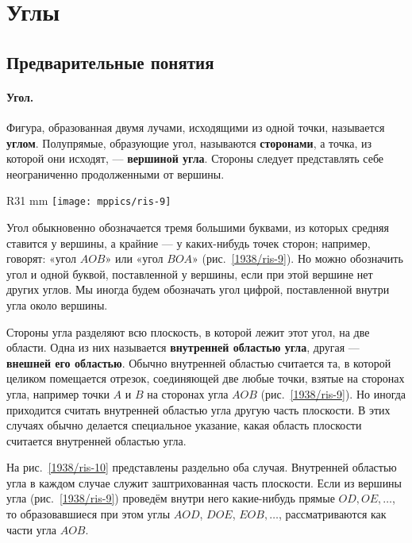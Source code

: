
\section{Углы} 

\subsection*{Предварительные понятия}

\paragraph{Угол.}\label{1938/13}
Фигура, образованная двумя лучами, исходящими из одной точки, называется \textbf{углом}.
Полупрямые, образующие угол, называются \textbf{сторонами}, а точка, из которой они исходят, — \textbf{вершиной угла}.
Стороны следует представлять себе неограниченно продолженными от вершины.

\begin{wrapfigure}{R}{31 mm}
\centering
\texttt{[image: mppics/ris-9]}
\caption{}\label{1938/ris-9}
\end{wrapfigure}

Угол обыкновенно обозначается тремя большими буквами, из которых средняя ставится у вершины, а крайние — у каких-нибудь точек сторон;
например, говорят:
«угол $AOB$» или «угол $BOA$» (рис.~\ref{1938/ris-9}).
Но можно обозначить угол и одной буквой, поставленной у вершины, если при этой вершине нет других углов.
Мы иногда будем обозначать угол цифрой, поставленной внутри угла около вершины.

Стороны угла разделяют всю плоскость, в которой лежит этот угол, на две области.
Одна из них называется \textbf{внутренней областью угла}, другая — \textbf{внешней его областью}.
Обычно внутренней областью считается та, в которой целиком помещается отрезок, соединяющей две любые точки, взятые на сторонах угла, например точки $A$ и $B$ на сторонах угла $AOB$ (рис.~\ref{1938/ris-9}).
Но иногда приходится считать внутренней областью угла другую часть плоскости.
В этих случаях обычно делается специальное указание, какая область плоскости считается внутренней областью угла.

На рис.~\ref{1938/ris-10} представлены раздельно оба случая.
Внутренней областью угла в каждом случае служит заштрихованная часть плоскости.
Если из вершины угла (рис.~\ref{1938/ris-9}) проведём внутри него какие-нибудь прямые $OD, OE,\dots$, то образовавшиеся при этом углы $AOD$, $DOE$, $EOB,\dots$, рассматриваются как части угла $AOB$.

